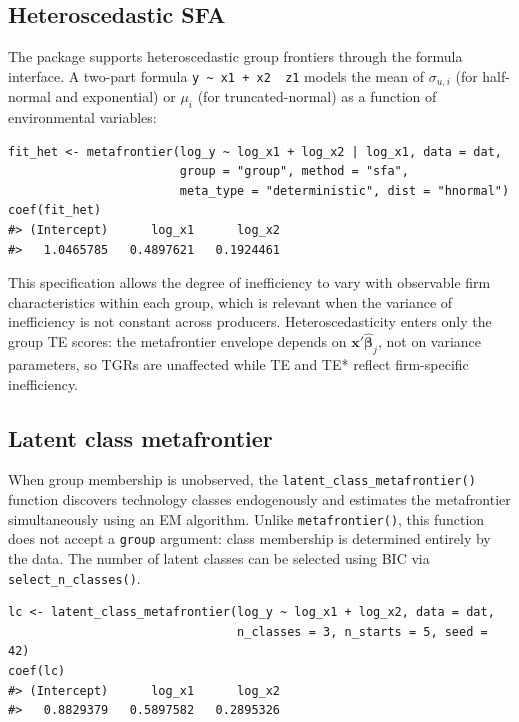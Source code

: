\subsection{Heteroscedastic SFA}\label{sec:heteroscedastic-sfa}

The package supports heteroscedastic group frontiers through the formula
interface. A two-part formula \texttt{y\ \textasciitilde{}\ x1\ +\ x2\ \textbar{}\ z1} models the mean of
\(\sigma_{u,i}\) (for half-normal and exponential) or \(\mu_i\) (for
truncated-normal) as a function of environmental variables:

\begin{verbatim}
fit_het <- metafrontier(log_y ~ log_x1 + log_x2 | log_x1, data = dat,
                        group = "group", method = "sfa",
                        meta_type = "deterministic", dist = "hnormal")
coef(fit_het)
#> (Intercept)      log_x1      log_x2 
#>   1.0465785   0.4897621   0.1924461
\end{verbatim}

This specification allows the degree of inefficiency to vary with observable
firm characteristics within each group, which is relevant when the variance
of inefficiency is not constant across producers. Heteroscedasticity enters
only the group TE scores: the metafrontier envelope depends on
\(\mathbf{x}'\widehat{\boldsymbol{\beta}}_j\), not on variance parameters, so
TGRs are unaffected while TE and TE* reflect firm-specific inefficiency.

\subsection{Latent class metafrontier}\label{sec:latent-class}

When group membership is unobserved, the \texttt{latent\_class\_metafrontier()} function
discovers technology classes endogenously and estimates the metafrontier
simultaneously using an EM algorithm. Unlike \texttt{metafrontier()}, this function
does not accept a \texttt{group} argument: class membership is determined entirely by
the data. The number of latent classes can be selected using BIC via
\texttt{select\_n\_classes()}.

\begin{verbatim}
lc <- latent_class_metafrontier(log_y ~ log_x1 + log_x2, data = dat,
                                n_classes = 3, n_starts = 5, seed = 42)
coef(lc)
#> (Intercept)      log_x1      log_x2 
#>   0.8829379   0.5897582   0.2895326
\end{verbatim}

